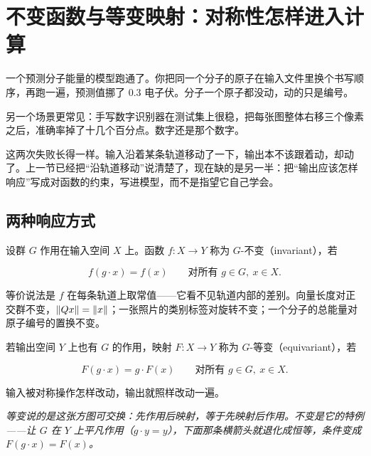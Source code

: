 \section{不变函数与等变映射：对称性怎样进入计算}
\label{sec:04-Discrete-Mathematics/06-Groups-and-Symmetry/04}

一个预测分子能量的模型跑通了。你把同一个分子的原子在输入文件里换个书写顺序，再跑一遍，预测值挪了 \(0.3\) 电子伏。分子一个原子都没动，动的只是编号。

另一个场景更常见：手写数字识别器在测试集上很稳，把每张图整体右移三个像素之后，准确率掉了十几个百分点。数字还是那个数字。

这两次失败长得一样。输入沿着某条轨道移动了一下，输出本不该跟着动，却动了。上一节已经把``沿轨道移动''说清楚了，现在缺的是另一半：把``输出应该怎样响应''写成对函数的约束，写进模型，而不是指望它自己学会。

\subsection{两种响应方式}

设群 \(G\) 作用在输入空间 \(X\) 上。函数 \(f:X\to Y\) 称为 \(G\)-不变（invariant），若

\[
f(g\cdot x)=f(x)\qquad\text{对所有 }g\in G,\ x\in X.
\]

等价说法是 \(f\) 在每条轨道上取常值——它看不见轨道内部的差别。向量长度对正交群不变，\(\left\lVert Qx\right\rVert=\left\lVert x\right\rVert\)；一张照片的类别标签对旋转不变；一个分子的总能量对原子编号的置换不变。

若输出空间 \(Y\) 上也有 \(G\) 的作用，映射 \(F:X\to Y\) 称为 \(G\)-等变（equivariant），若

\[
F(g\cdot x)=g\cdot F(x)\qquad\text{对所有 }g\in G,\ x\in X.
\]

输入被对称操作怎样改动，输出就照样改动一遍。

\begin{center}

\emph{等变说的是这张方图可交换：先作用后映射，等于先映射后作用。不变是它的特例——让 \(G\) 在 \(Y\) 上平凡作用（\(g\cdot y=y\)），下面那条横箭头就退化成恒等，条件变成 \(F(g\cdot x)=F(x)\)。}
\end{center}

